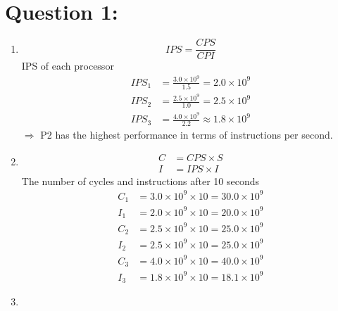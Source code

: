 \documentclass[12pt,a4paper]{article}
\begin{document}
\begin{titlepage}
\begin{center}
\begin{minipage}{0.4\textwidth}
\begin{flushright}
      \end{flushright}
    \end{minipage}

    \vfill

    \vspace{2cm}
    {\large} %
  \end{center}
\end{titlepage}


\section*{Question 1:}
\begin{enumerate}[label=\alph*.]
  \item%
        \begin{equation*}
          IPS = \frac{CPS}{CPI}
        \end{equation*}
        IPS of each processor
        \begin{align*}
          IPS_1 & = \frac{3.0 \times 10^9}{1.5} = 2.0 \times 10^9       \\
          IPS_2 & = \frac{2.5 \times 10^9}{1.0} = 2.5 \times 10^9       \\
          IPS_3 & = \frac{4.0 \times 10^9}{2.2} \approx 1.8 \times 10^9
        \end{align*}
        \(\Rightarrow\) P2 has the highest performance in terms of instructions per second.
  \item%
        \begin{align*}
          C & = CPS \times S \\
          I & = IPS \times I
        \end{align*}
        The number of cycles and instructions after 10 seconds
        \begin{align*}
          C_1 & = 3.0 \times 10^9 \times 10 = 30.0 \times 10^9 \\
          I_1 & = 2.0 \times 10^9 \times 10 = 20.0 \times 10^9 \\
          C_2 & = 2.5 \times 10^9 \times 10 = 25.0 \times 10^9 \\
          I_2 & = 2.5 \times 10^9 \times 10 = 25.0 \times 10^9 \\
          C_3 & = 4.0 \times 10^9 \times 10 = 40.0 \times 10^9 \\
          I_3 & = 1.8 \times 10^9 \times 10 = 18.1 \times 10^9
        \end{align*}
  \item%

\end{enumerate}
\end{document}
